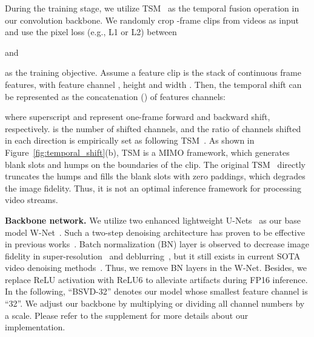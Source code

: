 \documentclass[sigconf]{acmart}
\begin{document}
During the training stage, we utilize TSM~\cite{Lin2019TSM}
as the temporal fusion operation in our convolution backbone.
We randomly crop -frame clips from videos as input and use the pixel loss (e.g., L1 or L2) between 
 
and 

as the training objective. Assume a feature clip  is the stack of  continuous frame features, with feature channel , height  and width .
Then, the temporal  shift can be represented as the concatenation () of features channels:

where
superscript  and  represent one-frame forward and backward shift, respectively.  is the number of shifted channels, and the ratio of channels shifted in each direction is empirically set as  following TSM~\cite{Lin2019TSM}.
As shown in Figure~\ref{fig:temporal_shift}(b), TSM is a MIMO framework, which generates blank slots and humps on the boundaries of the clip.
The original TSM~\cite{Lin2019TSM} directly truncates the humps and fills the blank slots with zero paddings, which degrades the image fidelity. Thus, it is not an optimal inference framework for processing video streams.

\textbf{Backbone network.}
We utilize two enhanced lightweight U-Nets~\cite{Xia2017WNetAD,Ronneberger2015U-Net} as our base model W-Net~\cite{Xia2017WNetAD}.
Such a two-step denoising architecture has proven to be effective in previous works~\cite{Tassano2020FastDVDNet, Xia2017WNetAD,Sheth2021UDVD}. Batch normalization (BN) layer is observed to decrease image fidelity in super-resolution~\cite{Lim2017EDSR,esrgan} and deblurring~\cite{SeungjunNah2017DeepMC}, but it still exists in current SOTA video denoising methods~\cite{Tassano2020FastDVDNet,Vaksman2021Patch}.
Thus, we remove BN layers in the W-Net.
Besides, we replace ReLU activation with ReLU6 to alleviate artifacts during FP16 inference. In the following, ``BSVD-32'' denotes our model whose smallest feature channel is ``32''. We adjust our backbone by multiplying or dividing all channel numbers by a scale. Please refer to the supplement for more details about our implementation.
\end{document}
